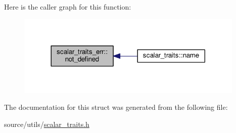 Here is the caller graph for this function\-:\nopagebreak
\begin{figure}[H]
\begin{center}
\leavevmode
\includegraphics[width=308pt]{structscalar__traits__err_ad8b64912940a767387a2b071e47c4d21_icgraph}
\end{center}
\end{figure}




The documentation for this struct was generated from the following file\-:\begin{DoxyCompactItemize}
\item 
source/utils/\hyperlink{scalar__traits_8h}{scalar\-\_\-traits.\-h}\end{DoxyCompactItemize}
